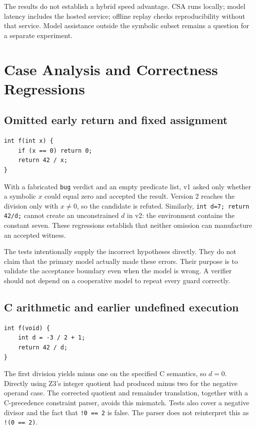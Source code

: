 \documentclass[sigconf]{acmart}
\begin{document}
\CostDiscussion{}
The results do not establish a hybrid speed advantage. CSA runs locally;
model latency includes the hosted service; offline replay checks reproducibility
without that service. Model assistance outside the symbolic subset remains a
question for a separate experiment.

\section{Case Analysis and Correctness Regressions}
\subsection{Omitted early return and fixed assignment}
\begin{lstlisting}[caption={A safe program that exposed the v1 acceptance defect.},label={lst:guard}]
int f(int x) {
    if (x == 0) return 0;
    return 42 / x;
}
\end{lstlisting}
With a fabricated \texttt{bug} verdict and an empty predicate list, v1 asked
only whether a symbolic $x$ could equal zero and accepted the result. Version 2
reaches the division only with $x\ne0$, so the candidate is refuted. Similarly,
\texttt{int d=7; return 42/d;} cannot create an unconstrained $d$ in v2: the
environment contains the constant seven. These regressions establish that
neither omission can manufacture an accepted witness.

The tests intentionally supply the incorrect hypotheses directly. They do not
claim that the primary model actually made these errors. Their purpose is to
validate the acceptance boundary even when the model is wrong. A verifier
should not depend on a cooperative model to repeat every guard correctly.

\subsection{C arithmetic and earlier undefined execution}
\begin{lstlisting}[caption={C truncation changes which later denominator is zero.},label={lst:arithmetic}]
int f(void) {
    int d = -3 / 2 + 1;
    return 42 / d;
}
\end{lstlisting}
The first division yields minus one on the specified C semantics, so $d=0$.
Directly using Z3's integer quotient had produced minus two for the negative
operand case. The corrected quotient and remainder translation, together with
a C-precedence constraint parser, avoids this mismatch. Tests also cover a
negative divisor and the fact that \texttt{!0 == 2} is false. The parser does
not reinterpret this as \texttt{!(0 == 2)}.
\end{document}
